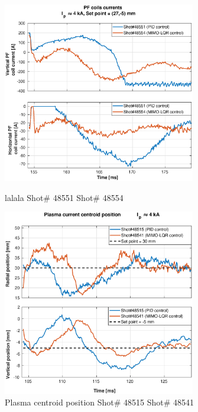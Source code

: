 \begin{figure}
	\centering
	\includegraphics[width=0.75\textwidth]{Chp5/PIDvsMIMO_551_554_curr_2.eps}
	\label{564_559curr}
	\caption{lalala  Shot\# 48551 Shot\# 48554}
\end{figure}
\begin{figure}
	\centering
	\includegraphics[width=0.75\textwidth]{Chp5/PIDvsMIMO_515_541_2.eps}
	\caption{Plasma centroid position  Shot\# 48515 Shot\# 48541}
\end{figure}

